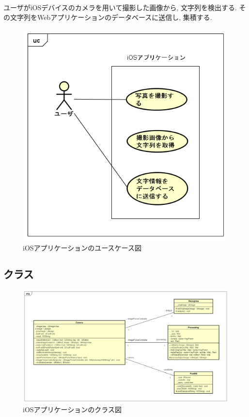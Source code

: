 ユーザがiOSデバイスのカメラを用いて撮影した画像から, 文字列を検出する.
その文字列をWebアプリケーションのデータベースに送信し, 集積する.
\begin{figure}
\begin{center}
\includegraphics[width=14cm]{fig/usecase_ios.png}
\end{center}
\caption{iOSアプリケーションのユースケース図}
\end{figure}

\subsection{クラス}
\begin{figure}
\begin{center}
\includegraphics[width=17cm]{fig/class_ios.png}
\end{center}
\caption{iOSアプリケーションのクラス図}
\end{figure}

